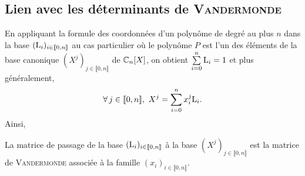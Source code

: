 \subsection{Lien avec les déterminants de \textsc{Vandermonde}}

En appliquant la formule des coordonnées d'un polynôme de degré au plus $n$ dans la base $(\mathrm{L}_i)_{i \in \llbracket 0, n \rrbracket}$ au cas particulier où le polynôme $P$ est l'un des éléments de la base canonique $(X^j)_{j \in \llbracket 0, n \rrbracket}$ de $\mathbb{C}_n[X]$, on obtient $\sum\limits_{i=0}^{n} \mathrm{L}_i = 1$ et plus généralement, 
$$\forall j \in \llbracket 0, n \rrbracket,\ X^j = \sum_{i=0}^{n} x_i ^j \Lag_i.$$
Ainsi, 
\begin{prop}{}
    La matrice de passage de la base  $(\mathrm{L}_i)_{i \in \llbracket 0, n \rrbracket}$ à la base  $(X^j)_{j \in \llbracket 0, n \rrbracket}$ est la matrice de \textsc{Vandermonde} associée à la famille $(x_i)_{i \in \llbracket 0, n \rrbracket}$.
\end{prop}
